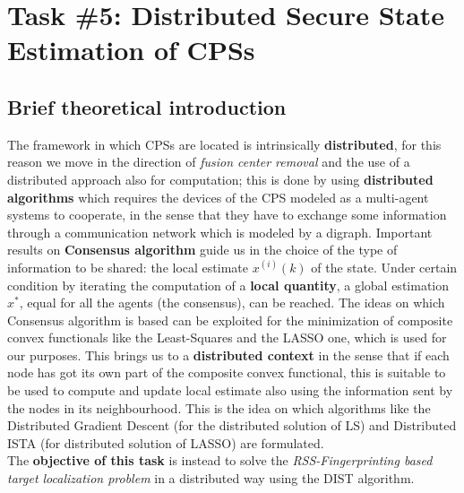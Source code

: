 \pagebreak
\section*{Task \#5: Distributed Secure State Estimation of CPSs}

\subsection*{Brief theoretical introduction}
The framework in which CPSs are located is intrinsically \textbf{distributed}, for this reason we move in the direction of \textit{fusion center removal} and the use of a distributed approach also for computation; this is done by using \textbf{distributed algorithms} which requires the devices of the CPS modeled as a multi-agent systems to 
cooperate, in the sense that they have to exchange some information through a communication network which is modeled by a digraph. 
Important results on \textbf{Consensus algorithm} guide us in the choice of the type of information to be shared: the local estimate $x^{(i)}(k)$ of the state. Under certain condition by iterating the computation of a \textbf{local quantity}, a global estimation $x^*$, equal for all the agents (the consensus), can be reached.
The ideas on which Consensus algorithm is based can be exploited for the minimization of composite convex functionals like the Least-Squares and the LASSO one, which is used for our purposes.
This brings us to a \textbf{distributed context} in the sense that if each node has got its own part of the composite convex functional, this is suitable to be used to compute and update local estimate also using the information sent by the nodes in its neighbourhood. This is the idea on which algorithms like the Distributed Gradient Descent (for the distributed solution of LS) and Distributed ISTA (for distributed solution of LASSO) are formulated.\\
The \textbf{objective of this task} is instead to solve the \textit{RSS-Fingerprinting based target localization problem} in a distributed way using the DIST algorithm.
 
\vspace{-0.3cm}

